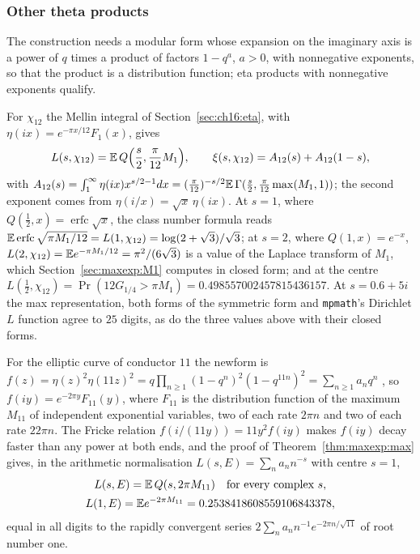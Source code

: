\subsubsection{Other theta products}\label{sec:maxexp:products}

The construction needs a modular form whose expansion on the imaginary axis is a power of $q$ times a product of factors $1-q^a$, $a>0$, with nonnegative exponents, so that the product is a distribution function; eta products with nonnegative exponents qualify.

For $\chi_{12}$ the Mellin integral of Section~\ref{sec:ch16:eta}, with $\eta(ix)=e^{-\pi x/12}F_1(x)$, gives
\[
L(s,\chi_{12})=\mathbb{E}\,Q\Big(\frac s2,\frac\pi{12}M_1\Big),\qquad\xi(s,\chi_{12})=A_{12}(s)+A_{12}(1-s),
\]
with $A_{12}(s)=\int_1^\infty\eta(ix)x^{s/2-1}dx=(\frac\pi{12})^{-s/2}\mathbb{E}\,\Gamma(\frac s2,\frac\pi{12}\max(M_1,1))$; the second exponent comes from $\eta(i/x)=\sqrt x\,\eta(ix)$. At $s=1$, where $Q(\frac12,x)=\operatorname{erfc}\sqrt x$, the class number formula reads $\mathbb{E}\operatorname{erfc}\sqrt{\pi M_1/12}=L(1,\chi_{12})=\log(2+\sqrt3)/\sqrt3$; at $s=2$, where $Q(1,x)=e^{-x}$, $L(2,\chi_{12})=\mathbb{E} e^{-\pi M_1/12}=\pi^2/(6\sqrt3)$ is a value of the Laplace transform of $M_1$, which Section~\ref{sec:maxexp:M1} computes in closed form; and at the centre $L(\frac12,\chi_{12})=\Pr(12G_{1/4}>\pi M_1)=0.498557002457815436157$. At $s=0.6+5i$ the max representation, both forms of the symmetric form and \texttt{mpmath}'s Dirichlet $L$ function agree to $25$ digits, as do the three values above with their closed forms.

For the elliptic curve of conductor $11$ the newform is $f(z)=\eta(z)^2\eta(11z)^2=q\prod_{n\ge1}(1-q^n)^2(1-q^{11n})^2=\sum_{n\ge1}a_nq^n$ \cite[modular form 11.2.a.a]{LMFDB}, so $f(iy)=e^{-2\pi y}F_{11}(y)$, where $F_{11}$ is the distribution function of the maximum $M_{11}$ of independent exponential variables, two of each rate $2\pi n$ and two of each rate $22\pi n$. The Fricke relation $f(i/(11y))=11y^2f(iy)$ makes $f(iy)$ decay faster than any power at both ends, and the proof of Theorem~\ref{thm:maxexp:max} gives, in the arithmetic normalisation $L(s,E)=\sum_na_nn^{-s}$ with centre $s=1$,
\[
\begin{gathered}L(s,E)=\mathbb{E}\,Q(s,2\pi M_{11})\quad\text{for every complex }s,\\ L(1,E)=\mathbb{E} e^{-2\pi M_{11}}=0.2538418608559106843378,\end{gathered}
\]
equal in all digits to the rapidly convergent series $2\sum_na_nn^{-1}e^{-2\pi n/\sqrt{11}}$ of root number one.

